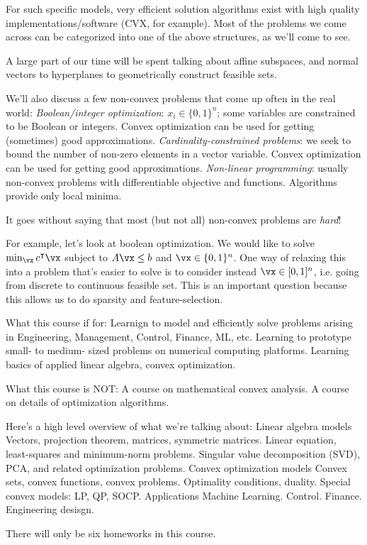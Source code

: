 \documentclass[11 pt]{scrartcl}
\begin{document}
For such specific models, very efficient solution algorithms exist with high quality implementations/software (CVX, for example). 
Most of the problems we come across can be categorized into one of the above structures, as we'll come to see. 

A large part of our time will be spent talking about affine subspaces, and normal vectors to hyperplanes to geometrically construct feasible sets. 

We'll also discuss a few non-convex problems that come up often in the real world: 
\itemnum
    \ii \emph{Boolean/integer optimization}: $x_i\in \{0,1\}^n$; some variables are constrained to be Boolean or integers. Convex optimization can be used for getting (sometimes) good approximations. 
    \ii \emph{Cardinality-constrained problems}: we seek to bound the number of non-zero elements in a vector variable. Convex optimization can be used for getting good approximations. 
    \ii \emph{Non-linear programming}: usually non-convex problems with differentiable objective and functions. Algorithms provide only local minima. 
\itemend

It goes without saying that most (but not all) non-convex problems are \emph{hard}!

For example, let's look at boolean optimization. We would like to solve $\min_{\vx} c^\T \vx$ subject to $A\vx \leq b$ and $\vx\in \{0,1\}^n$. 
One way of relaxing this into a problem that's easier to solve is to consider instead $\vx \in [0,1]^n$, i.e. going from discrete to continuous feasible set.
This is an important question because this allows us to do sparsity and feature-selection. 

What this course if for: 
\itemnum
    \ii Learnign to model and efficiently solve problems arising in Engineering, Management, Control, Finance, ML, etc. 
    \ii Learning to prototype small- to medium- sized problems on numerical computing platforms. 
    \ii Learning basics of applied linear algebra, convex optimization.
\itemend

What this course is NOT: 
\itemnum
    \ii A course on mathematical convex analysis.
    \ii A course on details of optimization algorithms. 
\itemend

Here's a high level overview of what we're talking about: 
\itemnum
    \ii Linear algebra models 
    \itemnum
        \ii Vectors, projection theorem, matrices, symmetric matrices.
        \ii Linear equation, least-squares and minimum-norm problems.
        \ii Singular value decomposition (SVD), PCA, and related optimization problems. 
    \itemend
    \ii Convex optimization models 
    \itemnum
        \ii Convex sets, convex functions, convex problems. 
        \ii Optimality conditions, duality. 
        \ii Special convex models: LP, QP, SOCP.
    \itemend
    \ii Applications 
    \itemnum
        \ii Machine Learning.
        \ii Control.
        \ii Finance.
        \ii Engineering desisgn.
    \itemend
\itemend

There will only be six homeworks in this course.
\end{document}
